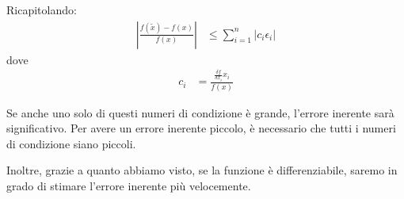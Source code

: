 \documentclass{article}
\begin{document}
Ricapitolando:
\begin{equation}
    \begin{aligned}
        \left\lvert \frac{f(\tilde{x})-f(x)}{f(x)}\right\rvert&\leq
        \displaystyle\sum_{i=1}^{n} \left\lvert c_i\epsilon_i\right\rvert
    \end{aligned}
    \label{eq:numero_condizione_1}
\end{equation}
dove 
\begin{equation}
    \begin{aligned}
        c_i&=\frac{\frac{\delta f}{\delta x_i}x_i}{f(x)} 
    \end{aligned} 
    \label{eq:numero_condizione_2}
\end{equation}

Se anche uno solo di questi numeri di condizione è grande, l'errore inerente
sarà significativo. Per avere un errore inerente piccolo, è necessario che
tutti i numeri di condizione siano piccoli.

Inoltre, grazie a quanto abbiamo visto, se la funzione è differenziabile,
saremo in grado di stimare l'errore inerente più velocemente.
\end{document}
